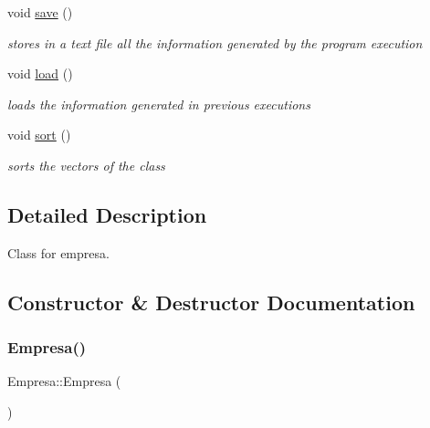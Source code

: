 \begin{DoxyCompactItemize}
\mbox{\label{classEmpresa_afbde694da902870437443de43dae8071}} 
void \hyperlink{classEmpresa_afbde694da902870437443de43dae8071}{save} ()
\begin{DoxyCompactList}\small\item\em stores in a text file all the information generated by the program execution \end{DoxyCompactList}\item 
\mbox{\label{classEmpresa_a3445c3c507b4f45d1d7831908ff4cdf1}} 
void \hyperlink{classEmpresa_a3445c3c507b4f45d1d7831908ff4cdf1}{load} ()
\begin{DoxyCompactList}\small\item\em loads the information generated in previous executions \end{DoxyCompactList}\item 
\mbox{\label{classEmpresa_aa7424cde3bdf1b1921967bc176d0ab50}} 
void \hyperlink{classEmpresa_aa7424cde3bdf1b1921967bc176d0ab50}{sort} ()
\begin{DoxyCompactList}\small\item\em sorts the vectors of the class \end{DoxyCompactList}\end{DoxyCompactItemize}


\subsection{Detailed Description}
Class for empresa. 

\subsection{Constructor \& Destructor Documentation}
\mbox{\label{classEmpresa_aff124b958356c479ab50ddf4cf302193}} 
\subsubsection{\texorpdfstring{Empresa()}{Empresa()}}
{\footnotesize\ttfamily Empresa\+::\+Empresa (\begin{DoxyParamCaption}{ }\end{DoxyParamCaption})}



